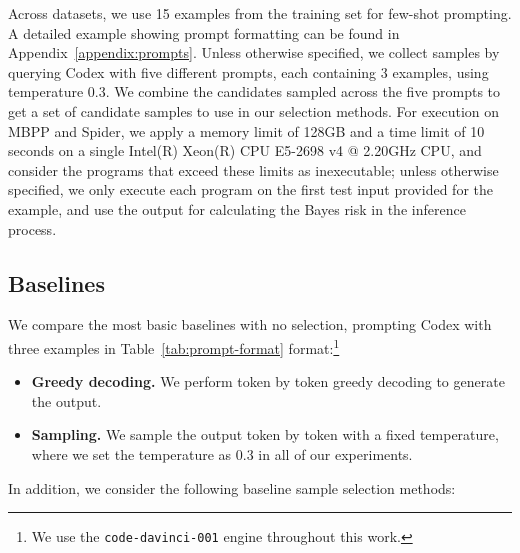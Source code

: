 \documentclass[11pt]{article}
\begin{document}
Across datasets, we use 15 examples from the training set for few-shot prompting. A detailed example showing prompt formatting can be found in Appendix~\ref{appendix:prompts}. Unless otherwise specified, we collect samples by querying Codex with five different prompts, each containing 3 examples, using temperature 0.3. We combine the candidates sampled across the five prompts to get a set of candidate samples to use in our selection methods. For execution on MBPP and Spider, we apply a memory limit of 128GB and a time limit of 10 seconds on a single Intel(R) Xeon(R) CPU E5-2698 v4 @ 2.20GHz CPU, and consider the programs that exceed these limits as inexecutable; unless otherwise specified, we only execute each program on the first test input provided for the example, and use the output for calculating the Bayes risk in the inference process. 
 \subsection{Baselines}
\label{sec:expr-baselines}
We compare the most basic baselines with no selection, prompting Codex with three examples in Table~\ref{tab:prompt-format} format:\footnote{We use the \texttt{code-davinci-001} engine throughout this work.}
\begin{itemize}[leftmargin=*]\setlength{\itemsep}{0pt}
    \item \textbf{Greedy decoding.} We perform token by token greedy decoding to generate the output. 
    \item \textbf{Sampling.} We sample the output token by token with a fixed temperature, where we set the temperature as 0.3 in all of our experiments. 
\end{itemize}
In addition, we consider the following baseline sample selection methods:
\end{document}
